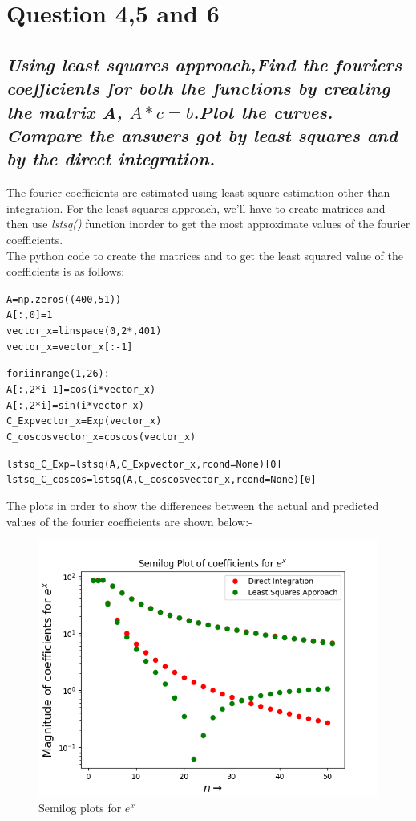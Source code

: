 \documentclass[11pt, a4paper]{article}
\begin{document}
\section{Question 4,5 and 6}
\subsection*{\textsl{Using least squares approach,Find the fouriers coefficients for both the functions by creating the matrix A, $A*c=b$.Plot the curves. Compare the answers got by least squares and by the direct integration.  }}
The fourier coefficients are estimated using least square estimation other than integration. For the least squares approach, we'll have to create matrices and then use \textit{lstsq()} function inorder to get the most approximate values of the fourier coefficients.\\
The python code  to create the matrices and to get the least squared value of the coefficients is as follows:

\begin{alltt}	
A = np.zeros((400, 51)) 
A[:, 0] = 1 
vector_x = linspace(0, 2*\pi, 401) 
vector_x = vector_x[:-1] 

for i in range(1, 26):
    A[:, 2*i-1] = cos(i*vector_x) 
    A[:, 2*i] = sin(i*vector_x) 
C_Expvector_x = Exp(vector_x)
C_coscosvector_x = coscos(vector_x)

lstsq_C_Exp = lstsq(A, C_Expvector_x, rcond=None)[0]	 
lstsq_C_coscos = lstsq(A, C_coscosvector_x, rcond=None)[0]
\end{alltt}

The plots in order to show the differences between the actual and predicted values of the fourier coefficients are shown below:-
\cleardoublepage

	\begin{figure}[!tbh]
   	\centering
   	\includegraphics[scale=0.6]{Ass4_Figure_7.png}   
   	\caption{Semilog plots for $e^{x}$}
   	\label{fig:sample}
   \end{figure} 
   
\end{document}
